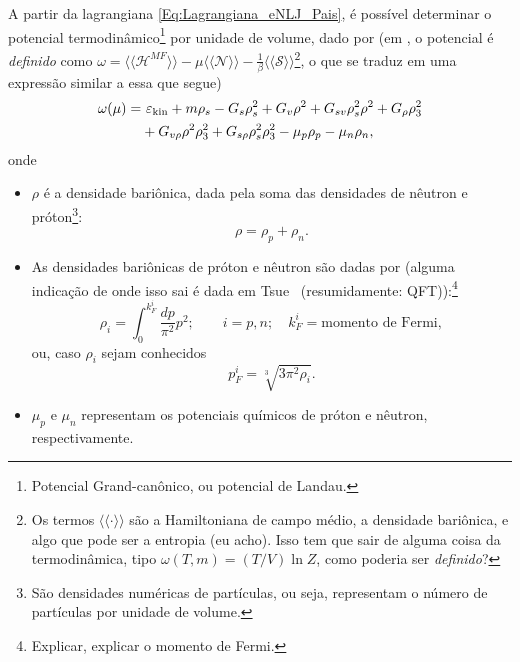 A partir da lagrangiana \eqref{Eq:Lagrangiana_eNLJ_Pais}, é possível determinar  o potencial termodinâmico\footnote{Potencial Grand-canônico, ou potencial de Landau.} por unidade de volume, dado por (em \textcite{japoneses}, o potencial é \emph{definido} como $\omega = \langle\langle \mathcal{H}^{MF}\rangle\rangle - \mu\langle\langle\mathcal{N}\rangle\rangle - \frac{1}{\beta}\langle\langle\mathcal{S}\rangle\rangle$\footnote{Os termos $\langle\langle \cdot \rangle\rangle$ são a Hamiltoniana de campo médio, a densidade bariônica, e algo que pode ser a entropia (eu acho). Isso tem que sair de alguma coisa da termodinâmica, tipo $\omega (T, m) = (T/V) \ln Z$, como poderia ser \emph{definido}?}, o que se traduz em uma expressão similar a essa que segue)
\begin{equation}\label{Eq:potencial_termodinamico}
\begin{split}
	\omega(\mu) =&~ \varepsilon_{\rm{kin}} + m\rho_s - G_s\rho_s^2 + G_v\rho^2 + G_{sv}\rho_s^2\rho^2 + G_\rho\rho_3^2 \\
	&+ G_{v\rho}\rho^2\rho_3^2 + G_{s\rho}\rho_s^2\rho_3^2 - \mu_p\rho_p - \mu_n\rho_n,
\end{split}
\end{equation}
%
onde
\begin{itemize}
	\item $\rho$ é a densidade bariônica, dada pela soma das densidades de nêutron e próton\footnote[][-1cm]{São densidades numéricas de partículas, ou seja, representam o número de partículas por unidade de volume.}:
	\begin{equation}
		\rho = \rho_p + \rho_n.
	\end{equation}

	\item As densidades bariônicas de próton e nêutron são dadas por (alguma indicação de onde isso sai é dada em Tsue~\cite{japoneses} (resumidamente: QFT)):\footnote{Explicar, explicar o momento de Fermi.}
	\begin{equation}
		\rho_i = \int_0^{k_F^i}\frac{dp}{\pi^2}p^2; \qquad i = p,n; \quad k_F^i = \textrm{momento de Fermi},
	\end{equation}
	ou, caso $\rho_i$ sejam conhecidos
	\begin{equation}\label{Eq:Mom_Fermi_a_partir_de_rho}
		p_F^i = \sqrt[3]{3\pi^2\rho_i}.
	\end{equation}
	
	\item $\mu_p$ e $\mu_n$ representam os potenciais químicos de próton e nêutron, respectivamente.
\end{itemize}

